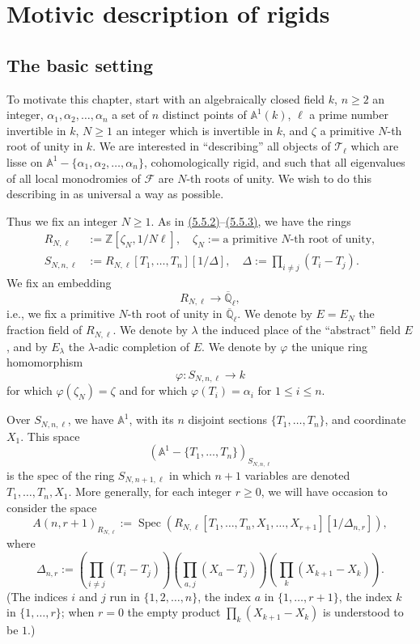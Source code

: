 \chapter{Motivic description of rigids}
\label{chap:8}
\setcounter{section}{-1}

\section{The basic setting}
\label{sec:8.0}

To motivate this chapter, start with an algebraically closed field \(k\), \(n\geq2\) an integer, \(\alpha_1,\alpha_2,\ldots,\alpha_n\) a set of \(n\) distinct points of \(\mathbb{A}^1(k)\), \(\ell\) a prime number invertible in \(k\), \(N\geq1\) an integer which is invertible in \(k\), and \(\zeta\) a primitive \(N\)-th root of unity in \(k\). We are interested in ``describing'' all objects of \(\mathcal{T}_\ell\) which are lisse on \(\mathbb{A}^1-\{\alpha_1,\alpha_2,\ldots,\alpha_n\}\), cohomologically rigid, and such that all eigenvalues of all local monodromies of \(\mathcal{F}\) are \(N\)-th roots of unity. We wish to do this describing in as universal a way as possible.

Thus we fix an integer \(N\geq1\). As in \hyperref[par:5.5.2]{(5.5.2)}--\hyperref[par:5.5.3]{(5.5.3)}, we have the rings
\[
\begin{aligned}
R_{N,\ell}&:=\mathbb{Z}[\zeta_N,1/N\ell],
\quad \zeta_N:=\text{a primitive }N\text{-th root of unity},\\
S_{N,n,\ell}&:=R_{N,\ell}[T_1,\ldots,T_n][1/\Delta],
\quad \Delta:=\prod_{i\ne j}(T_i-T_j).
\end{aligned}
\]
We fix an embedding
\[
R_{N,\ell}\to\overline{\mathbb{Q}}_\ell,
\]
i.e., we fix a primitive \(N\)-th root of unity in \(\overline{\mathbb{Q}}_\ell\). We denote by \(E=E_N\) the fraction field of \(R_{N,\ell}\). We denote by \(\lambda\) the induced place of the ``abstract'' field \(E\), and by \(E_\lambda\) the \(\lambda\)-adic completion of \(E\). We denote by \(\varphi\) the unique ring homomorphism
\[
\varphi:S_{N,n,\ell}\to k
\]
for which \(\varphi(\zeta_N)=\zeta\) and for which \(\varphi(T_i)=\alpha_i\) for \(1\leq i\leq n\).

Over \(S_{N,n,\ell}\), we have \(\mathbb{A}^1\), with its \(n\) disjoint sections \(\{T_1,\ldots,T_n\}\), and coordinate \(X_1\). This space
\[
(\mathbb{A}^1-\{T_1,\ldots,T_n\})_{S_{N,n,\ell}}
\]
is the spec of the ring \(S_{N,n+1,\ell}\) in which \(n+1\) variables are denoted \(T_1,\ldots,T_n,X_1\). More generally, for each integer \(r\geq0\), we will have occasion to consider the space
\[
A(n,r+1)_{R_{N,\ell}}:=\operatorname{Spec}(R_{N,\ell}[T_1,\ldots,T_n,X_1,\ldots,X_{r+1}][1/\Delta_{n,r}]),
\]
where
\[
\Delta_{n,r}:=\left(\prod_{i\ne j}(T_i-T_j)\right)\left(\prod_{a,j}(X_a-T_j)\right)\left(\prod_k(X_{k+1}-X_k)\right).
\]
(The indices \(i\) and \(j\) run in \(\{1,2,\ldots,n\}\), the index \(a\) in \(\{1,\ldots,r+1\}\), the index \(k\) in \(\{1,\ldots,r\}\); when \(r=0\) the empty product \(\prod_k(X_{k+1}-X_k)\) is understood to be \(1\).)

